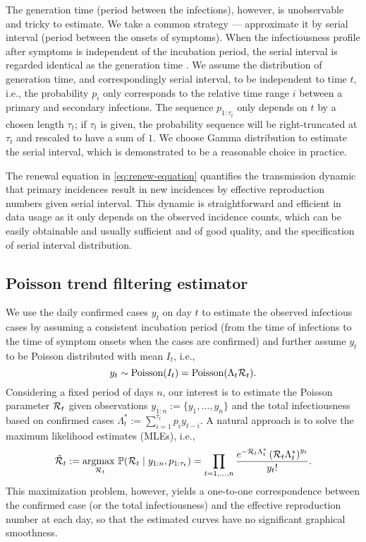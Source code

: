 The generation time (period between the infections), however, is unobservable and tricky to estimate. We take a common strategy --- approximate it by serial interval (period between the onsets of symptoms). When the infectiousness profile after symptoms is independent of the incubation period, the serial interval is regarded identical as the generation time \citep{cori2013new}. 
We assume the distribution of generation time, and correspondingly serial interval, to be independent to time $t$, i.e., the probability $p_i$ only corresponds to the relative time range $i$ between a primary and secondary infections. The sequence $p_{1:\tau_t}$ only depends on $t$ by a chosen length $\tau_t$; if $\tau_t$ is given, the probability sequence will be right-truncated at $\tau_t$ and rescaled to have a sum of $1$. 
We choose Gamma distribution to estimate the serial interval, which is demonstrated to be a reasonable choice in practice. %


The renewal equation in \eqref{eq:renew-equation} quantifies the transmission dynamic that primary incidences result in new incidences by effective reproduction numbers given serial interval. This dynamic is straightforward and efficient in data usage as it only depends on the observed incidence counts, which can be easily obtainable and usually sufficient and of good quality, and the specification of serial interval distribution. 

\subsection{Poisson trend filtering estimator} %

We use the daily confirmed cases $y_t$ on day $t$ to estimate the observed infectious cases by assuming a consistent incubation period (from the time of infections to the time of symptom onsets when the cases are confirmed) and further assume $y_t$ to be Poisson distributed with mean $I_t$, i.e., 
\begin{equation*} 
  y_t \sim \mathrm{Poisson}(I_t) = \mathrm{Poisson}(\Lambda_t \mathcal{R}_t).
\end{equation*}
Considering a fixed period of days $n$, our interest is to estimate the Poisson parameter $\mathcal{R}_t$ given observations ${y}_{1:n} := \{y_1,\dots,y_n\}$ and the total infectiousness based on confirmed cases $\Lambda^{\ast}_t := \sum_{i=1}^{\tau_t} p_i y_{t-i}$. A natural approach is to solve the maximum likelihood estimates (MLEs), i.e., 
\begin{equation} \label{eq:mle}
  \hat{\mathcal{R}}_t := \underset{\mathcal{R}_t}{\operatorname*{argmax}\ } \mathbb{P}(\mathcal{R}_t \mid y_{1:n}, p_{1:\tau_t}) = \prod_{t = 1,\dots,n} \frac{e^{- \mathcal{R}_t \Lambda^{\ast}_t} \left(\mathcal{R}_t \Lambda^{\ast}_t\right)^{y_t} }{y_t!}.
\end{equation}
This maximization problem, however, yields a one-to-one correspondence between the confirmed case (or the total infectiousness) and the effective reproduction number at each day, so that the estimated curves have no significant graphical smoothness. 

